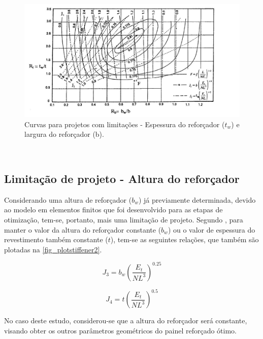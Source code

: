 {\begin{figure}[ht]
	\caption{\label{fig_plotstiffener}Curvas para projetos com limitações - Espessura do reforçador ($t_w$) e largura do reforçador (b).}
  \centering
  \includegraphics[scale=0.7]{figura/PlotStiffener}
\end{figure}
\

\subsection{Limitação de projeto - Altura do reforçador}
Considerando uma altura de reforçador ($b_w$) já previamente determinada, devido ao modelo em elementos finitos que foi desenvolvido para as etapas de otimização, tem-se, portanto, mais uma limitação de projeto. Segundo \cite{niu1997airframe}, para manter o valor da altura do reforçador constante ($b_w$) ou o valor de espessura do revestimento também constante ($t$), tem-se as seguintes relações, que também são plotadas na \autoref{fig_plotstiffener2}.

\begin{equation} \label{Farrar_Efficiency_J3}
J_3 = b_w({\dfrac{E_t}{NL^3}})^{0.25}
\end{equation}

\begin{equation} \label{Farrar_Efficiency_J4}
J_4 = t({\dfrac{E_t}{NL^3}})^{0.5}
\end{equation}

No caso deste estudo, considerou-se que a altura do reforçador será constante, visando obter os outros parâmetros geométricos do painel reforçado ótimo.

}
